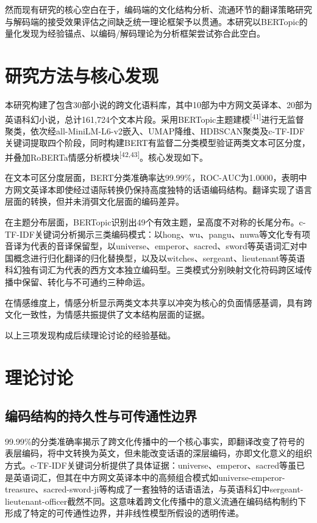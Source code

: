 \documentclass[12pt, a4paper]{article}
\newcommand{\citemark}[1]{\textsuperscript{[#1]}}
\begin{document}
然而现有研究的核心空白在于，编码端的文化结构分析、流通环节的翻译策略研究与解码端的接受效果评估之间缺乏统一理论框架予以贯通。本研究以BERTopic的量化发现为经验锚点、以编码/解码理论为分析框架尝试弥合此空白。

\section{研究方法与核心发现}

本研究构建了包含30部小说的跨文化语料库，其中10部为中方网文英译本、20部为英语科幻小说，总计161,724个文本片段。采用BERTopic主题建模\citemark{41}进行无监督聚类，依次经all-MiniLM-L6-v2嵌入、UMAP降维、HDBSCAN聚类及c-TF-IDF关键词提取四个阶段，同时构建BERT有监督二分类模型验证两类文本可区分度，并叠加RoBERTa情感分析模块\citemark{42,43}。核心发现如下。

在文本可区分度层面，BERT分类准确率达99.99\%，ROC-AUC为1.0000，表明中方网文英译本即使经过语际转换仍保持高度独特的话语编码结构。翻译实现了语言层面的转换，但并未消弭文化层面的编码差异。

在主题分布层面，BERTopic识别出49个有效主题，呈高度不对称的长尾分布。c-TF-IDF关键词分析揭示三类编码模式：以hong、wu、pangu、nuwa等文化专有项音译为代表的音译保留型，以universe、emperor、sacred、sword等英语词汇对中国概念进行归化翻译的归化替换型，以及以witches、sergeant、lieutenant等英语科幻独有词汇为代表的西方文本独立编码型。三类模式分别映射文化符码跨区域传播中保留、转化与不可通约三种命运。

在情感维度上，情感分析显示两类文本共享以冲突为核心的负面情感基调，具有跨文化一致性，为情感共振提供了文本结构层面的证据。

以上三项发现构成后续理论讨论的经验基础。

\section{理论讨论}

\subsection{编码结构的持久性与可传通性边界}

99.99\%的分类准确率揭示了跨文化传播中的一个核心事实，即翻译改变了符号的表层编码，将中文转换为英文，但未能改变话语的深层编码，亦即文化意义的组织方式。c-TF-IDF关键词分析提供了具体证据：universe、emperor、sacred等虽已是英语词汇，但其在中方网文英译本中的高频组合模式如universe-emperor-treasure、sacred-sword-ji等构成了一套独特的话语语法，与英语科幻中sergeant-lieutenant-officer截然不同。这意味着跨文化传播中的意义流通在编码结构制约下形成了特定的可传通性边界，并非线性模型所假设的透明传递。
\end{document}

